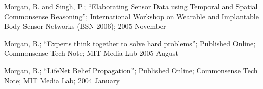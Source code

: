 \vspace{5mm}

\noindent Morgan, B. and Singh, P.; ``Elaborating Sensor Data using
 Temporal and Spatial Commonsense Reasoning''; International Workshop
 on Wearable and Implantable Body Sensor Networks (BSN-2006); 2005
 November

\vspace{5mm}

\noindent Morgan, B.; ``Experts think together to solve hard problems'';
 Published Online; Commonsense Tech Note; MIT Media Lab 2005 August

\vspace{5mm}

\noindent Morgan, B.; ``LifeNet Belief Propagation''; Published Online;
 Commonsense Tech Note; MIT Media Lab; 2004 January
